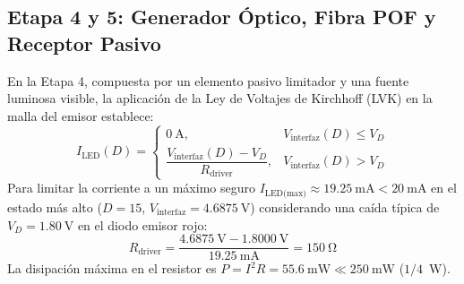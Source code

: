 \documentclass[journal,transmag]{IEEEtran}
\begin{document}
\subsection{Etapa 4 y 5: Generador Óptico, Fibra POF y Receptor Pasivo}
En la Etapa 4, compuesta por un elemento pasivo limitador y una fuente luminosa visible, la aplicación de la Ley de Voltajes de Kirchhoff (LVK) en la malla del emisor establece:
\begin{equation}
I_{\text{LED}}(D) = \begin{cases} \SI{0}{\ampere}, & V_{\text{interfaz}}(D) \le V_D \\ \dfrac{V_{\text{interfaz}}(D) - V_D}{R_{\text{driver}}}, & V_{\text{interfaz}}(D) > V_D \end{cases}
\label{eq:lvk_led}
\end{equation}
Para limitar la corriente a un máximo seguro $I_{\text{LED(max)}} \approx \SI{19.25}{\milli\ampere} < \SI{20}{\milli\ampere}$ en el estado más alto ($D=15$, $V_{\text{interfaz}} = \SI{4.6875}{\volt}$) considerando una caída típica de $V_D = \SI{1.80}{\volt}$ en el diodo emisor rojo:
\begin{equation}
R_{\text{driver}} = \frac{\SI{4.6875}{\volt} - \SI{1.8000}{\volt}}{\SI{19.25}{\milli\ampere}} = \SI{150}{\ohm}
\label{eq:rdriver}
\end{equation}
La disipación máxima en el resistor es $P = I^2 R = \SI{55.6}{\milli\watt} \ll \SI{250}{\milli\watt}$ ($1/4$~W).
\end{document}
